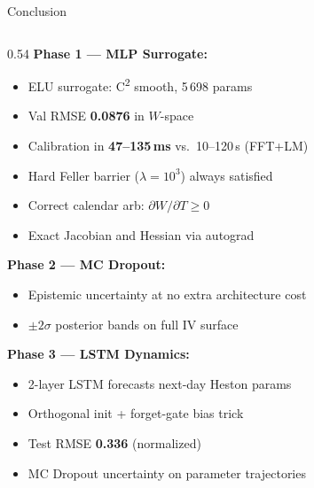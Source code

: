 \documentclass[aspectratio=169, 10pt]{beamer}
\begin{document}
\begin{frame}{Conclusion}
  \begin{columns}[T]
    \begin{column}{0.54\textwidth}
      \textbf{Phase 1 — MLP Surrogate:}
      \begin{itemize}\small
        \item[\checkmark] ELU surrogate: C\textsuperscript{2} smooth, 5\,698 params
        \item[\checkmark] Val RMSE \textbf{0.0876} in $W$-space
        \item[\checkmark] Calibration in \textbf{47--135\,ms} vs.\ 10--120\,s (FFT+LM)
        \item[\checkmark] Hard Feller barrier ($\lambda=10^3$) always satisfied
        \item[\checkmark] Correct calendar arb: $\partial W/\partial T\ge0$
        \item[\checkmark] Exact Jacobian and Hessian via autograd
      \end{itemize}
      \vspace{0.2em}
      \textbf{Phase 2 — MC Dropout:}
      \begin{itemize}\small
        \item[\checkmark] Epistemic uncertainty at no extra architecture cost
        \item[\checkmark] $\pm2\sigma$ posterior bands on full IV surface
      \end{itemize}
      \vspace{0.2em}
      \textbf{Phase 3 — LSTM Dynamics:}
      \begin{itemize}\small
        \item[\checkmark] 2-layer LSTM forecasts next-day Heston params
        \item[\checkmark] Orthogonal init + forget-gate bias trick
        \item[\checkmark] Test RMSE \textbf{0.336} (normalized)
        \item[\checkmark] MC Dropout uncertainty on parameter trajectories
      \end{itemize}
    \end{column}


\end{columns}
\end{frame}
\end{document}
